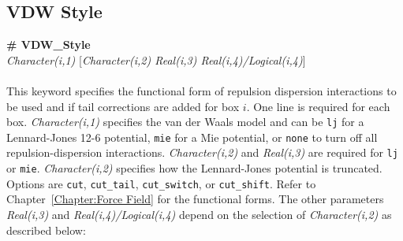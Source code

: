 \subsection{VDW Style}\label{sec:VDW_Style}
{\bf \# VDW\_Style} \\
{\it Character(i,1)} [{\it Character(i,2) Real(i,3) Real(i,4)/Logical(i,4)}] \\ \\
%
This keyword specifies the functional form of repulsion dispersion
interactions to be used and if tail corrections are added for box $i$.
One line is required for each box.
{\it Character(i,1)} specifies the van der Waals model and can be
\texttt{lj} for a Lennard-Jones 12-6 potential,
\texttt{mie} for a Mie potential,
or \texttt{none} to turn off all repulsion-dispersion interactions.
{\it Character(i,2)} and {\it Real(i,3)} are required for \texttt{lj} or \texttt{mie}.
{\it Character(i,2)} specifies how the Lennard-Jones potential is truncated.
Options are \texttt{cut}, \texttt{cut\_tail}, \texttt{cut\_switch}, or \texttt{cut\_shift}.
Refer to Chapter~\ref{Chapter:Force Field} for the functional forms.
The other parameters \emph{Real(i,3)} and \emph{Real(i,4)/Logical(i,4)} depend on the
selection of \emph{Character(i,2)} as described below:
%
